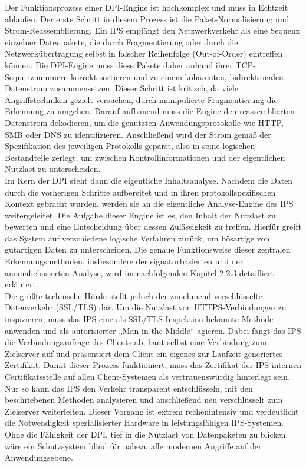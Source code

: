 Der Funktionsprozess einer DPI-Engine ist hochkomplex und muss in Echtzeit ablaufen. Der erste Schritt in diesem Prozess ist die Paket-Normalisierung und Strom-Reassemblierung. Ein IPS empfängt den Netzwerkverkehr als eine Sequenz einzelner Datenpakete, die durch Fragmentierung oder durch die Netzwerkübertragung selbst in falscher Reihenfolge (Out-of-Order) eintreffen können. Die DPI-Engine muss diese Pakete daher anhand ihrer TCP-Sequenznummern korrekt sortieren und zu einem kohärenten, bidirektionalen Datenstrom zusammensetzen. Dieser Schritt ist kritisch, da viele Angriffstechniken gezielt versuchen, durch manipulierte Fragmentierung die Erkennung zu umgehen. Darauf aufbauend muss die Engine den reassemblierten Datenstrom dekodieren, um die genutzten Anwendungsprotokolle wie HTTP, SMB oder DNS zu identifizieren. Anschließend wird der Strom gemäß der Spezifikation des jeweiligen Protokolls geparst, also in seine logischen Bestandteile zerlegt, um zwischen Kontrollinformationen und der eigentlichen Nutzlast zu unterscheiden.\\

Im Kern der DPI steht dann die eigentliche Inhaltsanalyse. Nachdem die Daten durch die vorherigen Schritte aufbereitet und in ihren protokollspezifischen Kontext gebracht wurden, werden sie an die eigentliche Analyse-Engine des IPS weitergeleitet. Die Aufgabe dieser Engine ist es, den Inhalt der Nutzlast zu bewerten und eine Entscheidung über dessen Zulässigkeit zu treffen. Hierfür greift das System auf verschiedene logische Verfahren zurück, um bösartige von gutartigen Daten zu unterscheiden. Die genaue Funktionsweise dieser zentralen Erkennungsmethoden, insbesondere der signaturbasierten und der anomaliebasierten Analyse, wird im nachfolgenden Kapitel 2.2.3 detailliert erläutert.\\

Die größte technische Hürde stellt jedoch der zunehmend verschlüsselte Datenverkehr (SSL/TLS) dar. Um die Nutzlast von HTTPS-Verbindungen zu inspizieren, muss das IPS eine als SSL/TLS-Inspektion bekannte Methode anwenden und als autorisierter „Man-in-the-Middle“ agieren. Dabei fängt das IPS die Verbindungsanfrage des Clients ab, baut selbst eine Verbindung zum Zielserver auf und präsentiert dem Client ein eigenes zur Laufzeit generiertes Zertifikat. Damit dieser Prozess funktioniert, muss das Zertifikat der IPS-internen Certifikatsstelle auf allen Client-Systemen als vertrauenswürdig hinterlegt sein. Nur so kann das IPS den Verkehr transparent entschlüsseln, mit den beschriebenen Methoden analysieren und anschließend neu verschlüsselt zum Zielserver weiterleiten. Dieser Vorgang ist extrem rechenintensiv und verdeutlicht die Notwendigkeit spezialisierter Hardware in leistungsfähigen IPS-Systemen. Ohne die Fähigkeit der DPI, tief in die Nutzlast von Datenpaketen zu blicken, wäre ein Schutzsystem blind für nahezu alle modernen Angriffe auf der Anwendungsebene. \cite{NIST1,Claudia1}

